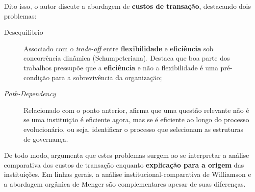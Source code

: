 \documentclass[9pt,twocolumn,twoside,lineno]{style}
\begin{document}
Dito isso, o autor discute a abordagem de \textbf{custos de transação}, destacando dois problemas:
\begin{description}
	\item[Desequilíbrio] Associado com o \textit{trade-off} entre \textbf{flexibilidade} e \textbf{eficiência} sob concorrência dinâmica (Schumpeteriana). Destaca que boa parte dos trabalhos pressupõe que a \textbf{eficiência} e não a flexibilidade é uma pré-condição para a sobrevivência da organização;
	\item[\textit{Path-Dependency}] Relacionado com o ponto anterior, afirma que uma questão relevante não é se uma instituição é eficiente agora, mas se é eficiente ao longo do processo evolucionário, ou seja, identificar o processo que selecionam as estruturas de governança.
\end{description}
De todo modo, argumenta que estes problemas surgem ao se interpretar a análise comparativa dos custos de transação enquanto \textbf{explicação para a origem} das instituições. Em linhas gerais, a análise institucional-comparativa de Williamson e a abordagem orgânica de Menger são complementares apesar de suas diferenças.
	
\end{document}
